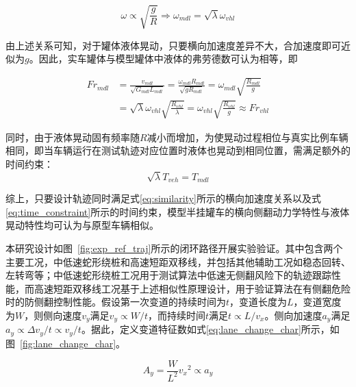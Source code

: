         
        \begin{equation}
        \left. \omega \propto \sqrt{\frac{g}{R}}\Rightarrow\omega_{mdl} = \sqrt{\lambda}\omega_{vhl} \right.
        \end{equation}

        由上述关系可知，对于罐体液体晃动，只要横向加速度差异不大，合加速度即可近似为$g$。因此，实车罐体与模型罐体中液体的弗劳德数可认为相等，即

    
        \begin{equation}
        \begin{split}
        Fr_{mdl} &= \frac{v_{mdl}}{\sqrt{G_{mdl}L_{mdl}}} = \frac{\omega_{mdl}R_{mdl}}{\sqrt{gR_{mdl}}} 
        = \omega_{mdl}\sqrt{\frac{R_{mdl}}{g}}\\ &= \sqrt{\lambda}\omega_{vhl}\sqrt{\frac{R_{vhl}}{\lambda}} = \omega_{vhl}\sqrt{\frac{R_{vhl}}{g}} \approx Fr_{vhl}
        \end{split}
        \end{equation}

        同时，由于液体晃动固有频率随$R$减小而增加，为使晃动过程相位与真实比例车辆相同，即当车辆运行在测试轨迹对应位置时液体也晃动到相同位置，需满足额外的时间约束：
        \begin{equation}
            \sqrt{\lambda}T_{veh}=T_{mdl}
            \label{eq:time_constraint}
        \end{equation}

        综上，只要设计轨迹同时满足式\eqref{eq:similarity}所示的横向加速度关系以及式\eqref{eq:time_constraint}所示的时间约束，模型半挂罐车的横向侧翻动力学特性与液体晃动特性均可认为与原型车辆相似。
        

        本研究设计如图~\ref{fig:exp_ref_traj}所示的闭环路径开展实验验证。其中包含两个主要工况，中低速蛇形绕桩和高速短距双移线，并包括其他辅助工况如稳态回转、左转弯等；中低速蛇形绕桩工况用于测试算法中低速无侧翻风险下的轨迹跟踪性能，而高速短距双移线工况基于上述相似性原理设计，用于验证算法在有侧翻危险时的防侧翻控制性能。假设第一次变道的持续时间为\(t\)，变道长度为\(L\)，变道宽度为\(W\)，则侧向速度\(v_y\)满足\(v_y \propto W/t\)，而持续时间\(t\)满足\(t \propto L/v_x\)。侧向加速度\(a_y\)满足\(a_y \propto \Delta v_y / t \propto v_y / t\)。据此，定义变道特征数如式\eqref{eq:lane_change_char}所示，如图~\ref{fig:lane_change_char}。

        \begin{equation}
        A_{y} = \frac{W}{L^{2}}{v_{x}}^{2} \propto a_{y}
        \label{eq:lane_change_char}
        \end{equation}

